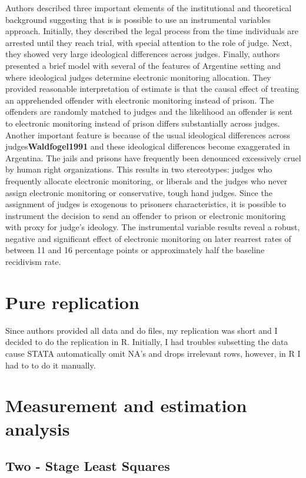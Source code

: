 \documentclass[a4paper,12pt]{article}
\begin{document}
Authors described three important elements of the institutional and theoretical background suggesting that is is possible to use an instrumental variables approach. Initially, they described the legal process from the time individuals are arrested until they reach trial, with special attention to the role of judge. Next, they showed very large ideological differences across judges. Finally, authors presented a brief model with several of the features of Argentine setting and where ideological judges determine electronic monitoring allocation.    
They provided reasonable interpretation of estimate is that the causal effect of treating an apprehended offender with electronic monitoring instead of prison. The offenders are randomly matched to judges and the likelihood an offender is sent to electronic monitoring instead of prison differs substantially across judges. Another important feature is because of the usual ideological differences across judges\textbf{Waldfogel1991}\cite{Waldfogel91} and these ideological differences become exaggerated in Argentina. The jails and prisons have frequently been denounced excessively cruel by human right organizations. This results in two stereotypes: judges who frequently allocate electronic monitoring, or liberals and the judges who never assign electronic monitoring or conservative, tough hand judges. Since the assignment of judges is exogenous to prisoners characteristics, it is possible to instrument the decision to send an offender to prison or electronic monitoring with proxy for judge's ideology. The instrumental variable results reveal a robust, negative and significant effect of electronic monitoring on later rearrest rates of between 11 and 16 percentage points or approximately half the baseline recidivism rate.   




\newpage
\section{Pure replication}
Since authors provided all data and do files, my replication was short and I decided to do the replication in R. Initially, I had troubles subsetting the data cause STATA automatically omit NA's and drops irrelevant rows, however, in R I had to to do it manually. 


\newpage
\section{Measurement and estimation analysis}
\subsection{Two - Stage Least Squares}
\end{document}
